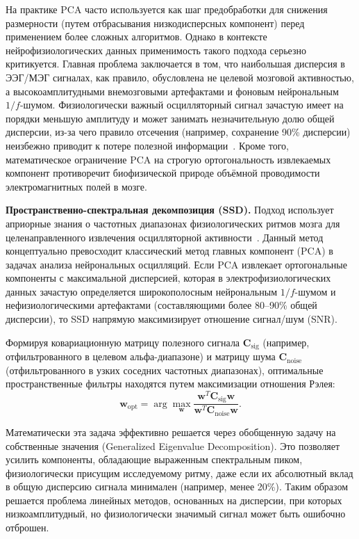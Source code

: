 На практике PCA часто используется как шаг предобработки для снижения размерности (путем отбрасывания низкодисперсных компонент) перед применением более сложных алгоритмов. Однако в контексте нейрофизиологических данных применимость такого подхода серьезно критикуется. Главная проблема заключается в том, что наибольшая дисперсия в ЭЭГ/МЭГ сигналах, как правило, обусловлена не целевой мозговой активностью, а высокоамплитудными внемозговыми артефактами и фоновым нейрональным $1/f$-шумом. Физиологически важный осцилляторный сигнал зачастую имеет на порядки меньшую амплитуду и может занимать незначительную долю общей дисперсии, из-за чего правило отсечения (например, сохранение 90\% дисперсии) неизбежно приводит к потере полезной информации~\cite{haufe2014dimensionality, jolliffe1982notepca}. Кроме того, математическое ограничение PCA на строгую ортогональность извлекаемых компонент противоречит биофизической природе объёмной проводимости электромагнитных полей в мозге.

\textbf{Пространственно-спектральная декомпозиция (SSD).}
Подход использует априорные знания о частотных диапазонах физиологических ритмов мозга для целенаправленного извлечения осцилляторной активности~\cite{haufe2014dimensionality, nikulin2011novel}. Данный метод концептуально превосходит классический метод главных компонент (PCA) в задачах анализа нейрональных осцилляций. Если PCA извлекает ортогональные компоненты с максимальной дисперсией, которая в электрофизиологических данных зачастую определяется широкополосным нейрональным $1/f$-шумом и нефизиологическими артефактами (составляющими более 80--90\% общей дисперсии), то SSD напрямую максимизирует отношение сигнал/шум (SNR).

Формируя ковариационную матрицу полезного сигнала $\mathbf{C}_{\text{sig}}$ (например, отфильтрованного в целевом альфа-диапазоне) и матрицу шума $\mathbf{C}_{\text{noise}}$ (отфильтрованного в узких соседних частотных диапазонах), оптимальные пространственные фильтры находятся путем максимизации отношения Рэлея:
\begin{equation}
	\mathbf{w}_{\text{opt}} = \arg\max_{\mathbf{w}} \frac{\mathbf{w}^T \mathbf{C}_{\text{sig}} \mathbf{w}}{\mathbf{w}^T \mathbf{C}_{\text{noise}} \mathbf{w}}.
\end{equation}

Математически эта задача эффективно решается через обобщенную задачу на собственные значения (Generalized Eigenvalue Decomposition). Это позволяет усилить компоненты, обладающие выраженным спектральным пиком, физиологически присущим исследуемому ритму, даже если их абсолютный вклад в общую дисперсию сигнала минимален (например, менее 20\%). Таким образом решается проблема линейных методов, основанных на дисперсии, при которых низкоамплитудный, но физиологически значимый сигнал может быть ошибочно отброшен.

